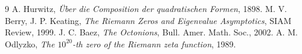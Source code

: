 \documentclass[11pt, a4paper]{article}
\begin{document}
	\begin{thebibliography}{9}
		\small
		 A. Hurwitz, \textit{Über die Composition der quadratischen Formen}, 1898.
		 M. V. Berry, J. P. Keating, \textit{The Riemann Zeros and Eigenvalue Asymptotics}, SIAM Review, 1999.
		 J. C. Baez, \textit{The Octonions}, Bull. Amer. Math. Soc., 2002.
		 A. M. Odlyzko, \textit{The $10^{20}$-th zero of the Riemann zeta function}, 1989.
	\end{thebibliography}
	
\end{document}
